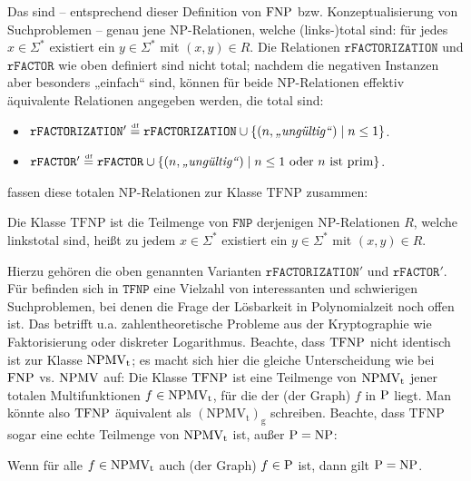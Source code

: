 Das sind – entsprechend dieser Definition von $\FNP$ bzw. Konzeptualisierung von Suchproblemen – genau jene NP-Relationen, welche (links-)total sind: für jedes $x\in\Sigma^*$ existiert ein $y\in\Sigma^*$ mit $(x,y)\in R$. 
Die Relationen $\mathtt{rFACTORIZATION}$ und $\mathtt{rFACTOR}$ wie oben definiert sind nicht total; nachdem die negativen Instanzen aber besonders „einfach“ sind, können für beide NP-Relationen effektiv äquivalente Relationen angegeben werden, die total sind:
\begin{itemize} \item $\mathtt{rFACTORIZATION}' \defeq \mathtt{rFACTORIZATION} \cup \{ (n, \text{\emph{„ungültig“}}) \mid n\leq 1 \}$.
    \item $\mathtt{rFACTOR}' \defeq \mathtt{rFACTOR} \cup \{ (n, \text{\emph{„ungültig“}}) \mid n\leq 1 \text{ oder $n$ ist prim} \}$.
\end{itemize}
\textcite{megiddo_total_1991} fassen diese totalen NP-Relationen zur Klasse $\mathrm{TFNP}$ zusammen:
\begin{definition}
    Die Klasse $\mathrm{TFNP}$ ist die Teilmenge von $\mathtt{FNP}$ derjenigen NP-Relationen $R$, welche linkstotal sind, heißt zu jedem $x\in\Sigma^*$ existiert ein $y\in\Sigma^*$ mit $(x,y)\in R$.
\end{definition}
Hierzu gehören die oben genannten Varianten $\mathtt{rFACTORIZATION}'$ und $\mathtt{rFACTOR}'$.
Für \citeauthor{megiddo_total_1991} befinden sich in $\mathtt{TFNP}$ eine Vielzahl von interessanten und schwierigen Suchproblemen, bei denen die Frage der Lösbarkeit in Polynomialzeit noch offen ist.
Das betrifft u.a. zahlentheoretische Probleme aus der Kryptographie wie Faktorisierung oder diskreter Logarithmus. Beachte, dass $\TFNP$ nicht identisch ist zur Klasse $\NPMVt$; es macht sich hier die gleiche Unterscheidung wie bei $\FNP$ vs. $\NPMV$ auf: Die Klasse $\TFNP$ ist eine Teilmenge von $\NPMVt$ jener totalen Multifunktionen $f\in\NPMVt$, für die der (der Graph) $f$ in $\P$ liegt. Man könnte also $\TFNP$ äquivalent als $\mathrm{(NPMV_{t})_{g}}$ schreiben.
Beachte, dass $\mathrm{TFNP}$ sogar eine echte Teilmenge von $\NPMVt$ ist, außer $\P=\NP$:
\begin{observation}\label{obs:npmvt-properin-tfnp}
    Wenn für alle $f\in\NPMVt$ auch (der Graph) $f\in \P$ ist, dann gilt $\P=\NP$.
\end{observation}
